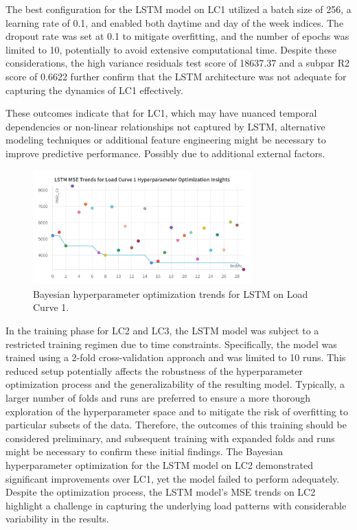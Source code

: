 \documentclass{article} %
\begin{document}
The best configuration for the \gls{LSTM} model on \gls{LC1} utilized a batch size of 256, a learning rate of 0.1, and enabled both daytime and day of the week indices. The dropout rate was set at 0.1 to mitigate overfitting, and the number of epochs was limited to 10, potentially to avoid extensive computational time. Despite these considerations, the high variance residuals test score of 18637.37 and a subpar R2 score of 0.6622 further confirm that the \gls{LSTM} architecture was not adequate for capturing the dynamics of \gls{LC1} effectively.

These outcomes indicate that for \gls{LC1}, which may have nuanced temporal dependencies or non-linear relationships not captured by \gls{LSTM}, alternative modeling techniques or additional feature engineering might be necessary to improve predictive performance.
Possibly due to additional external factors.

\begin{figure}[H]
    \centering
    \includegraphics[width=0.75\textwidth]{ressources/Hyperparams/LSTM/LSTM MSE Trends for Load Curve 1 Hyperparameter Optimization Insights.png}
    \caption{Bayesian hyperparameter optimization trends for LSTM on Load Curve 1.}
    \label{fig:lstm_lc1}
\end{figure}
In the training phase for \gls{LC2} and \gls{LC3}, the LSTM model was subject to a restricted training regimen due to time constraints. Specifically, the model was trained using a 2-fold cross-validation approach and was limited to 10 runs. This reduced setup potentially affects the robustness of the hyperparameter optimization process and the generalizability of the resulting model. Typically, a larger number of folds and runs are preferred to ensure a more thorough exploration of the hyperparameter space and to mitigate the risk of overfitting to particular subsets of the data. Therefore, the outcomes of this training should be considered preliminary, and subsequent training with expanded folds and runs might be necessary to confirm these initial findings.
The Bayesian hyperparameter optimization for the \gls{LSTM} model on \gls{LC2} demonstrated significant improvements over \gls{LC1}, yet the model failed to perform adequately. Despite the optimization process, the \gls{LSTM} model's \gls{MSE} trends on \gls{LC2} highlight a challenge in capturing the underlying load patterns with considerable variability in the results.
\end{document}
